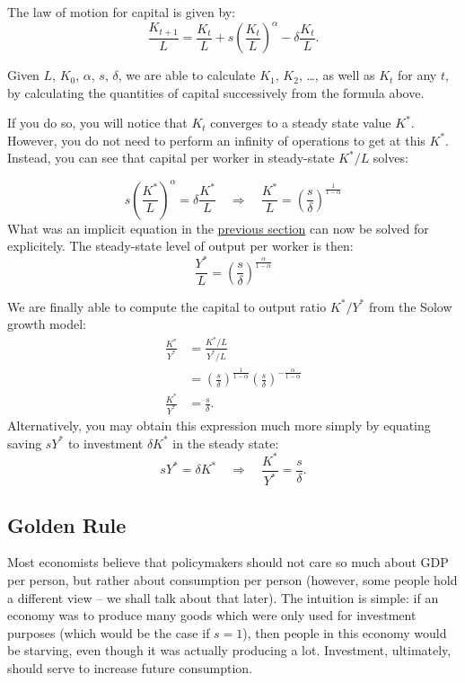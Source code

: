 \documentclass[]{book}
\theoremstyle{definition}
\theoremstyle{definition}
\theoremstyle{definition}
\theoremstyle{remark}
\begin{document}
The law of motion for capital is given by:\\
\[\frac{K_{t+1}}{L}=\frac{K_{t}}{L}+s\left(\frac{K_{t}}{L}\right)^{\alpha}-\delta\frac{K_{t}}{L}.\]

Given \(L\), \(K_{0}\), \(\alpha\), \(s\), \(\delta\), we are able to
calculate \(K_{1}\), \(K_{2}\), \ldots{}, as well as \(K_{t}\) for any
\(t\), by calculating the quantities of capital successively from the
formula above.

If you do so, you will notice that \(K_{t}\) converges to a steady state
value \(K^{*}\). However, you do not need to perform an infinity of
operations to get at this \(K^{*}\). Instead, you can see that capital
per worker in steady-state \(K^{*}/L\) solves:

\[s\left(\frac{K^{*}}{L}\right)^{\alpha}=\delta\frac{K^{*}}{L}\quad\Rightarrow\quad \boxed{\frac{K^{*}}{L}=\left(\frac{s}{\delta}\right)^{\frac{1}{1-\alpha}}}\]
What was an implicit equation in the
\protect\hyperlink{general-production-f}{previous section} can now be
solved for explicitely. The steady-state level of output per worker is
then:
\[\frac{Y^{*}}{L}=\left(\frac{s}{\delta}\right)^{\frac{\alpha}{1-\alpha}}\]

We are finally able to compute the capital to output ratio
\(K^{*}/Y^{*}\) from the Solow growth model: \[
\begin{aligned}
\frac{K^{*}}{Y^{*}}&=\frac{K^{*}/L}{Y^{*}/L}\\
&=\left(\frac{s}{\delta}\right)^{\frac{1}{1-\alpha}}  \left(\frac{s}{\delta}\right)^{-\frac{\alpha}{1-\alpha}} \\
\frac{K^{*}}{Y^{*}}&= \frac{s}{\delta}.
\end{aligned}
\] Alternatively, you may obtain this expression much more simply by
equating saving \(sY^{*}\) to investment \(\delta K^{*}\) in the steady
state:
\[sY^{*} = \delta K^{*} \quad \Rightarrow \quad \boxed{\frac{K^{*}}{Y^{*}} = \frac{s}{\delta}}.\]

\subsection{Golden Rule}\label{golden-rule}

Most economists believe that policymakers should not care so much about
GDP per person, but rather about consumption per person (however, some
people hold a different view -- we shall talk about that later). The
intuition is simple: if an economy was to produce many goods which were
only used for investment purposes (which would be the case if
\(s = 1\)), then people in this economy would be starving, even though
it was actually producing a lot. Investment, ultimately, should serve to
increase future consumption.
\end{document}
